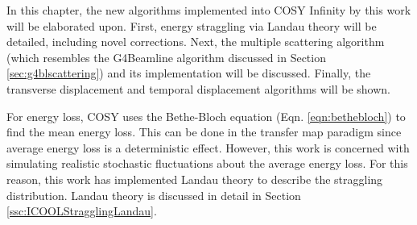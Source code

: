 
In this chapter, the new algorithms implemented into COSY Infinity by this work will be elaborated upon. First, energy straggling via Landau theory will be detailed, including novel corrections. Next, the multiple scattering algorithm (which resembles the G4Beamline algorithm discussed in Section \ref{sec:g4blscattering}) and its implementation will be discussed. Finally, the transverse displacement and temporal displacement algorithms will be shown.

 \label{sec:COSYStraggling}\par
For energy loss, COSY uses the Bethe-Bloch equation (Eqn. \ref{eqn:bethebloch}) to find the mean energy loss. This can be done in the transfer map paradigm since average energy loss is a deterministic effect. However, this work is concerned with simulating realistic stochastic fluctuations about the average energy loss. For this reason, this work has implemented Landau theory \cite{landau} to describe the straggling distribution. Landau theory is discussed in detail in Section \ref{ssc:ICOOLStragglingLandau}. 

